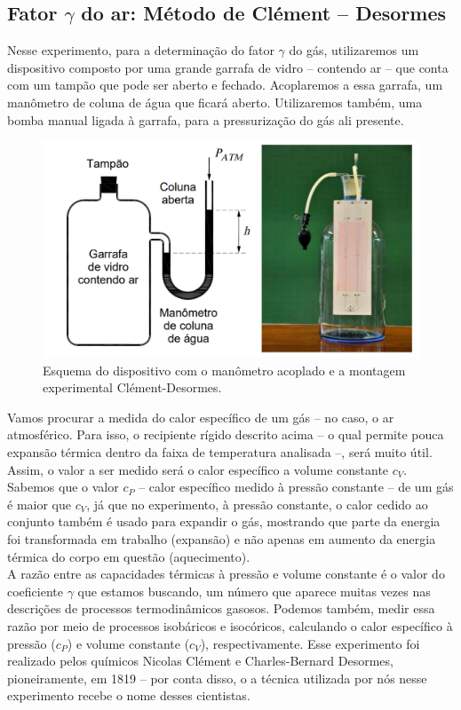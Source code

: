 \subsection{Fator $\gamma$ do ar: Método de Clément – Desormes}

Nesse experimento, para a determinação do fator $\gamma$ do gás, utilizaremos um dispositivo composto por uma grande garrafa de vidro – contendo ar – que conta com um tampão que pode ser aberto e fechado. Acoplaremos a essa garrafa, um manômetro de coluna de água que ficará aberto. Utilizaremos também, uma bomba manual ligada à garrafa, para a pressurização do gás ali presente.

\begin{figure}[H]
  \centering
  \includegraphics[scale=0.67]{images/Método Clément-Desormes.png}
  \caption{Esquema do dispositivo com o manômetro acoplado e a montagem experimental Clément-Desormes.}
\end{figure}

Vamos procurar a medida do calor específico de um gás – no caso, o ar atmosférico. Para isso, o recipiente rígido descrito acima – o qual permite pouca expansão térmica dentro da faixa de temperatura analisada –, será muito útil. Assim, o valor a ser medido será o calor específico a volume constante $c_V$. Sabemos que o valor $c_P$ – calor específico medido à pressão constante – de um gás é maior que $c_V$, já que no experimento, à pressão constante, o calor cedido ao conjunto também é usado para expandir o gás, mostrando que parte da energia foi transformada em trabalho (expansão) e não apenas em aumento da energia térmica do corpo em questão (aquecimento).\\

A razão entre as capacidades térmicas à pressão e volume constante é o valor do coeficiente $\gamma$ que estamos buscando, um número que aparece muitas vezes nas descrições de processos termodinâmicos gasosos. Podemos também, medir essa razão por meio de processos isobáricos e isocóricos, calculando o calor específico à pressão ($c_P$) e volume constante ($c_V$), respectivamente. Esse experimento foi realizado pelos químicos Nicolas Clément e Charles-Bernard Desormes, pioneiramente, em 1819 – por conta disso, o a técnica utilizada por nós nesse experimento recebe o nome desses cientistas. \\

